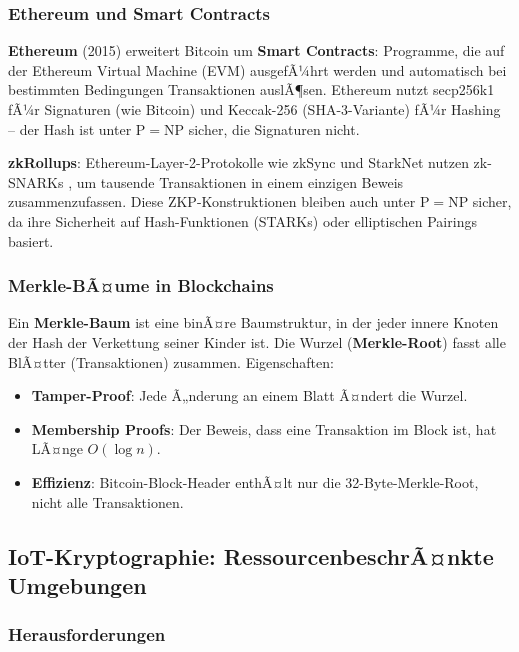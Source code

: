 ﻿\documentclass[a4paper,12pt]{scrreprt}
\theoremstyle{definition}
\begin{document}
\subsubsection{Ethereum und Smart Contracts}

\textbf{Ethereum} (2015) erweitert Bitcoin um \textbf{Smart Contracts}: Programme, die auf der Ethereum Virtual Machine (EVM) ausgefÃ¼hrt werden und automatisch bei bestimmten Bedingungen Transaktionen auslÃ¶sen. Ethereum nutzt secp256k1 fÃ¼r Signaturen (wie Bitcoin) und Keccak-256 (SHA-3-Variante) fÃ¼r Hashing -- der Hash ist unter $\mathrm{P}=\mathrm{NP}$ sicher, die Signaturen nicht.

\textbf{zkRollups}: Ethereum-Layer-2-Protokolle wie zkSync und StarkNet nutzen zk-SNARKs \cite{GGPR13}, um tausende Transaktionen in einem einzigen Beweis zusammenzufassen. Diese ZKP-Konstruktionen bleiben auch unter $\mathrm{P}=\mathrm{NP}$ sicher, da ihre Sicherheit auf Hash-Funktionen (STARKs) oder elliptischen Pairings basiert.

\subsubsection{Merkle-BÃ¤ume in Blockchains}

Ein \textbf{Merkle-Baum} \cite{Dam89} ist eine binÃ¤re Baumstruktur, in der jeder innere Knoten der Hash der Verkettung seiner Kinder ist. Die Wurzel (\textbf{Merkle-Root}) fasst alle BlÃ¤tter (Transaktionen) zusammen. Eigenschaften:
\begin{itemize}
    \item \textbf{Tamper-Proof}: Jede Ã„nderung an einem Blatt Ã¤ndert die Wurzel.
    \item \textbf{Membership Proofs}: Der Beweis, dass eine Transaktion im Block ist, hat LÃ¤nge $O(\log n)$.
    \item \textbf{Effizienz}: Bitcoin-Block-Header enthÃ¤lt nur die 32-Byte-Merkle-Root, nicht alle Transaktionen.
\end{itemize}

\subsection{IoT-Kryptographie: RessourcenbeschrÃ¤nkte Umgebungen}

\subsubsection{Herausforderungen}
\end{document}

